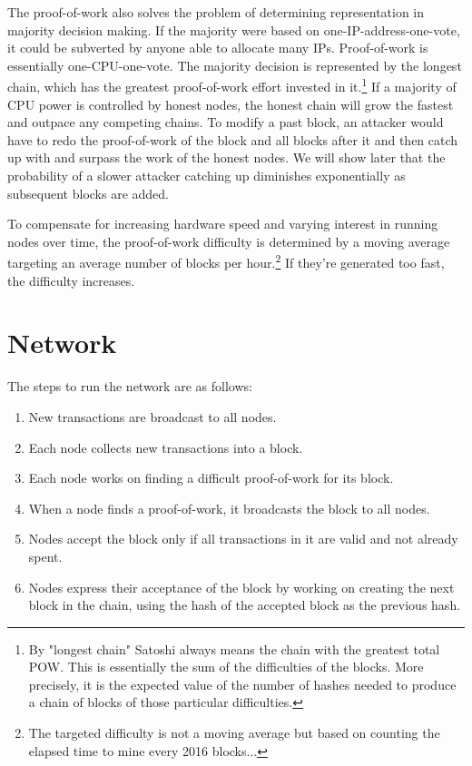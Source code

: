 \documentclass[nohyper]{tufte-handout}
\begin{document}
The proof-of-work also solves the problem of determining representation
in majority decision making. If the majority were based on
one-IP-address-one-vote, it could be subverted by anyone able to
allocate many IPs. Proof-of-work is essentially one-CPU-one-vote. The
majority decision is represented by the longest chain, which has the greatest proof-of-work effort invested in it.\footnote{By "longest chain" Satoshi always means the chain with the greatest total POW.  This is essentially the sum of the difficulties of the blocks.  More precisely, it is the expected value of the number of hashes needed to produce a chain of blocks of those particular difficulties.} If a majority of CPU power is controlled by honest nodes, the honest chain will grow the fastest and outpace any competing chains. To modify a past block, an attacker would have to redo the proof-of-work of the block and all blocks after
it and then catch up with and surpass the work of the honest nodes. We will show later that the probability of a slower attacker catching up
diminishes exponentially as subsequent blocks are added.

To compensate for increasing hardware speed and varying interest in running nodes over time, the proof-of-work difficulty is determined by a moving average targeting an average number of blocks per hour.\footnote{The targeted difficulty is not a moving average but based on counting the elapsed time to mine every 2016 blocks... }   If they're generated too fast, the difficulty increases.

\section{Network}\label{network}

The steps to run the network are as follows:

\begin{enumerate}[1)]
\item
  New transactions are broadcast to all nodes.
\item
  Each node collects new transactions into a block.
\item
  Each node works on finding a difficult proof-of-work for its block.
\item
  When a node finds a proof-of-work, it broadcasts the block to all
  nodes.
\item
  Nodes accept the block only if all transactions in it are valid and
  not already spent.
\item
  Nodes express their acceptance of the block by working on creating the
  next block in the chain, using the hash of the accepted block as the
  previous hash.
\end{enumerate}
\end{document}
